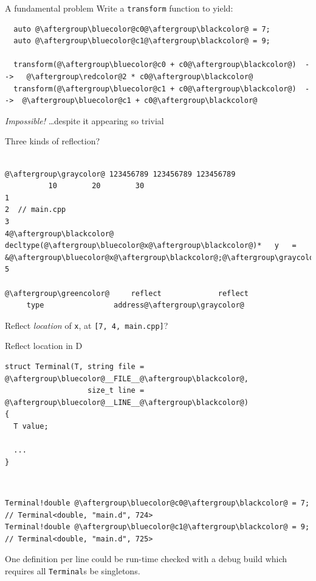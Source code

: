 \documentclass[xcolor=dvipsnames]{beamer}
\begin{document}
\begin{frame}[fragile]{A fundamental problem}
Write a \texttt{transform} function to yield:\vspace{10mm}
\begin{lstlisting}
  auto @\aftergroup\bluecolor@c0@\aftergroup\blackcolor@ = 7;
  auto @\aftergroup\bluecolor@c1@\aftergroup\blackcolor@ = 9;

  transform(@\aftergroup\bluecolor@c0 + c0@\aftergroup\blackcolor@)  -->   @\aftergroup\redcolor@2 * c0@\aftergroup\blackcolor@
  transform(@\aftergroup\bluecolor@c1 + c0@\aftergroup\blackcolor@)  -->  @\aftergroup\bluecolor@c1 + c0@\aftergroup\blackcolor@
\end{lstlisting}
\vspace{10mm}
\emph{Impossible!}
\ldots despite it appearing so trivial
\end{frame}


\begin{frame}[fragile]{Three kinds of reflection?}
  \begin{lstlisting}

@\aftergroup\graycolor@ 123456789 123456789 123456789
          10        20        30
1
2  // main.cpp
3
4@\aftergroup\blackcolor@  decltype(@\aftergroup\bluecolor@x@\aftergroup\blackcolor@)*   y   =   &@\aftergroup\bluecolor@x@\aftergroup\blackcolor@;@\aftergroup\graycolor@
5

@\aftergroup\greencolor@     reflect             reflect
     type                address@\aftergroup\graycolor@
  \end{lstlisting}
 \vspace{10mm}
Reflect \emph{location} of {\color{blue}\texttt{x}}, at {\color{red}\texttt{[7, 4, main.cpp]}}?
\end{frame}


\begin{frame}[fragile]{Reflect location in D}
\begin{lstlisting}
struct Terminal(T, string file = @\aftergroup\bluecolor@__FILE__@\aftergroup\blackcolor@,
                   size_t line = @\aftergroup\bluecolor@__LINE__@\aftergroup\blackcolor@)
{
  T value;

  ...
}
\end{lstlisting}

~

\begin{lstlisting}
Terminal!double @\aftergroup\bluecolor@c0@\aftergroup\blackcolor@ = 7; // Terminal<double, "main.d", 724>
Terminal!double @\aftergroup\bluecolor@c1@\aftergroup\blackcolor@ = 9; // Terminal<double, "main.d", 725>
\end{lstlisting}

\vspace{10mm}
{One definition per line could be run-time checked with a debug build which requires all \texttt{Terminal}s be singletons.}
\end{frame}


\begin{frame}[plain]
  \titlepage
\end{frame}
\end{document}
